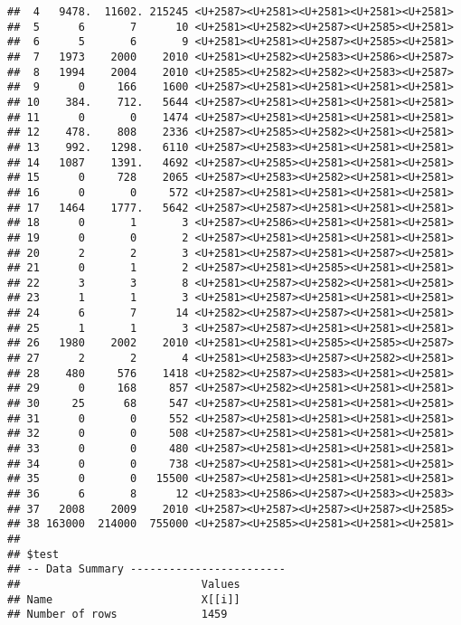 \documentclass[
]{article}
\begin{document}
\begin{verbatim}
##  4   9478.  11602. 215245 <U+2587><U+2581><U+2581><U+2581><U+2581>
##  5      6       7      10 <U+2581><U+2582><U+2587><U+2585><U+2581>
##  6      5       6       9 <U+2581><U+2581><U+2587><U+2585><U+2581>
##  7   1973    2000    2010 <U+2581><U+2582><U+2583><U+2586><U+2587>
##  8   1994    2004    2010 <U+2585><U+2582><U+2582><U+2583><U+2587>
##  9      0     166    1600 <U+2587><U+2581><U+2581><U+2581><U+2581>
## 10    384.    712.   5644 <U+2587><U+2581><U+2581><U+2581><U+2581>
## 11      0       0    1474 <U+2587><U+2581><U+2581><U+2581><U+2581>
## 12    478.    808    2336 <U+2587><U+2585><U+2582><U+2581><U+2581>
## 13    992.   1298.   6110 <U+2587><U+2583><U+2581><U+2581><U+2581>
## 14   1087    1391.   4692 <U+2587><U+2585><U+2581><U+2581><U+2581>
## 15      0     728    2065 <U+2587><U+2583><U+2582><U+2581><U+2581>
## 16      0       0     572 <U+2587><U+2581><U+2581><U+2581><U+2581>
## 17   1464    1777.   5642 <U+2587><U+2587><U+2581><U+2581><U+2581>
## 18      0       1       3 <U+2587><U+2586><U+2581><U+2581><U+2581>
## 19      0       0       2 <U+2587><U+2581><U+2581><U+2581><U+2581>
## 20      2       2       3 <U+2581><U+2587><U+2581><U+2587><U+2581>
## 21      0       1       2 <U+2587><U+2581><U+2585><U+2581><U+2581>
## 22      3       3       8 <U+2581><U+2587><U+2582><U+2581><U+2581>
## 23      1       1       3 <U+2581><U+2587><U+2581><U+2581><U+2581>
## 24      6       7      14 <U+2582><U+2587><U+2587><U+2581><U+2581>
## 25      1       1       3 <U+2587><U+2587><U+2581><U+2581><U+2581>
## 26   1980    2002    2010 <U+2581><U+2581><U+2585><U+2585><U+2587>
## 27      2       2       4 <U+2581><U+2583><U+2587><U+2582><U+2581>
## 28    480     576    1418 <U+2582><U+2587><U+2583><U+2581><U+2581>
## 29      0     168     857 <U+2587><U+2582><U+2581><U+2581><U+2581>
## 30     25      68     547 <U+2587><U+2581><U+2581><U+2581><U+2581>
## 31      0       0     552 <U+2587><U+2581><U+2581><U+2581><U+2581>
## 32      0       0     508 <U+2587><U+2581><U+2581><U+2581><U+2581>
## 33      0       0     480 <U+2587><U+2581><U+2581><U+2581><U+2581>
## 34      0       0     738 <U+2587><U+2581><U+2581><U+2581><U+2581>
## 35      0       0   15500 <U+2587><U+2581><U+2581><U+2581><U+2581>
## 36      6       8      12 <U+2583><U+2586><U+2587><U+2583><U+2583>
## 37   2008    2009    2010 <U+2587><U+2587><U+2587><U+2587><U+2585>
## 38 163000  214000  755000 <U+2587><U+2585><U+2581><U+2581><U+2581>
## 
## $test
## -- Data Summary ------------------------
##                            Values
## Name                       X[[i]]
## Number of rows             1459  

\end{verbatim}
\end{document}
